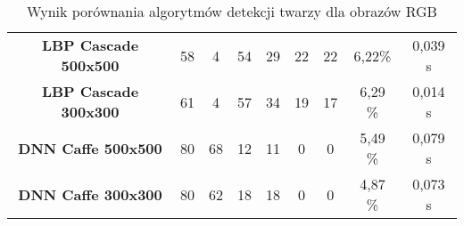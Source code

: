 \begin{table}[H]
{\begin{tabular}{|ccccccccc|}
  \textbf{LBP Cascade 500x500} &
  58 &
  4 &
  54 &
  29 &
  22 &
  22 &
  6,22\% &
  0,039 s \\
  
\rowcolor[HTML]{C0C0C0} 
  \textbf{LBP Cascade 300x300} &
  61 &
  4 &
  57 &
  34 &
  19 &
  17 &
  6,29 \% &
  0,014 s \\
  
\textbf{DNN Caffe 500x500} &
  80 &
  68 &
  12 &
  11 &
  0 &
  0 &
  5,49 \% &
  0,079 s \\
  
\rowcolor[HTML]{C0C0C0} 
\textbf{DNN Caffe 300x300} &
  80 &
  62 &
  18 &
  18 &
  0 &
  0 &
  4,87 \% &
  0,073 s \\ 
  
  \hline
\end{tabular}%
}
\caption{Wynik porównania algorytmów detekcji twarzy dla obrazów RGB}
\label{tab:face_detect_result_RGB}
\end{table}